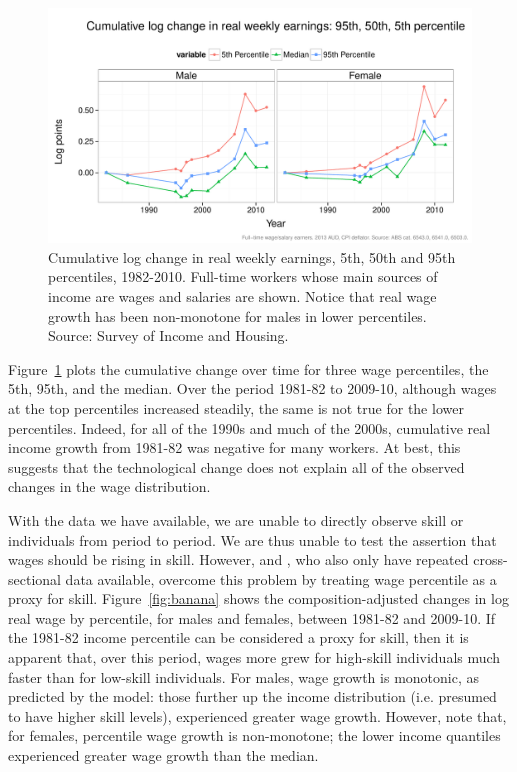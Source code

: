\begin{figure}
  \centering
  \includegraphics[width=\textwidth]{../figure/wage_change_time.pdf}
  \caption{Cumulative log change in real weekly earnings, 5th, 50th and 95th percentiles, 1982-2010. Full-time workers whose main sources of income are wages and salaries are shown. Notice that real wage growth has been non-monotone for males in lower percentiles. Source: Survey of Income and Housing.}
  \label{fig:changetime}
\end{figure}

Figure~\ref{fig:changetime} plots the cumulative change over time for three wage percentiles, the 5th, 95th, and the median. Over the period 1981-82 to 2009-10, although wages at the top percentiles increased steadily, the same is not true for the lower percentiles. Indeed, for all of the 1990s and much of the 2000s, cumulative real income growth from 1981-82 was negative for many workers. At best, this suggests that the technological change does not explain all of the observed changes in the wage distribution.

With the data we have available, we are unable to directly observe skill or individuals from period to period. We are thus unable to test the assertion that wages should be rising in skill. However, \citet{Goos2007} and \citet{Acemoglu2011}, who also only have repeated cross-sectional data available, overcome this problem by treating wage percentile as a proxy for skill.  Figure~\ref{fig:banana} shows the composition-adjusted changes in log real wage by percentile, for males and females, between 1981-82 and 2009-10. If the 1981-82 income percentile can be considered a proxy for skill, then it is apparent that, over this period, wages more grew for high-skill individuals much faster than for low-skill individuals. For males, wage growth is monotonic, as predicted by the model: those further up the income distribution (i.e. presumed to have higher skill levels), experienced greater wage growth. However, note that, for females, percentile wage growth is non-monotone; the lower income quantiles experienced greater wage growth than the median.

